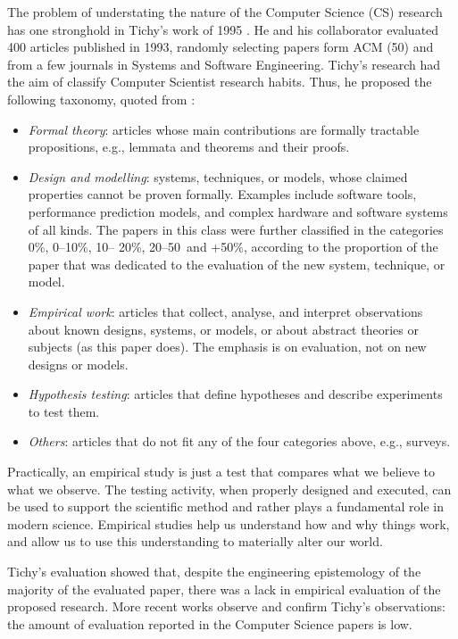The problem of understating the nature of the Computer Science (CS) research has one stronghold in Tichy's work of 1995 \cite{Tichy:1995:EEC:209090.209093}. He and his collaborator evaluated 400 articles published in 1993, randomly selecting papers form ACM (50) and from a few journals in Systems and Software Engineering. Tichy's research had the aim of classify Computer Scientist research habits. Thus, he proposed the following taxonomy, quoted from \cite{Tichy:1995:EEC:209090.209093}:
\begin{itemize}
\item \textit{Formal theory}: articles whose main contributions are formally tractable propositions, e.g., lemmata and theorems and their proofs.
\item \textit{Design and modelling}: systems, techniques, or models, whose claimed properties cannot be proven formally. Examples include software tools, performance prediction models, and complex hardware and software systems of all kinds. The papers in this class were further classified in the categories 0\%, 0–10\%, 10– 20\%, 20–50\, and +50\%, according to the proportion of the paper that was dedicated to the evaluation of the new system, technique, or model.
\item \textit{Empirical work}: articles that collect, analyse, and interpret observations about known designs, systems, or models, or about abstract theories or subjects (as this paper does). The emphasis is on evaluation, not on new designs or models.
\item \textit{Hypothesis testing}: articles that define hypotheses and describe experiments to test them.
\item \textit{Others}: articles that do not fit any of the four categories above, e.g., surveys.
\end{itemize}

Practically, an empirical study is just a test that compares what we believe to what we observe. The testing activity, when properly designed and executed, can be used to support the scientific method and rather plays a fundamental role in modern science. Empirical studies help us understand how and why things work, and allow us to use this understanding to materially alter our world.

Tichy's evaluation showed that, despite the engineering epistemology of the majority of the evaluated paper, there was a lack in empirical evaluation of the proposed research. More recent works \cite{Wainer:2009:EEC:1518331.1518552} observe and confirm Tichy's observations: the amount of evaluation reported in the Computer Science papers is low.

